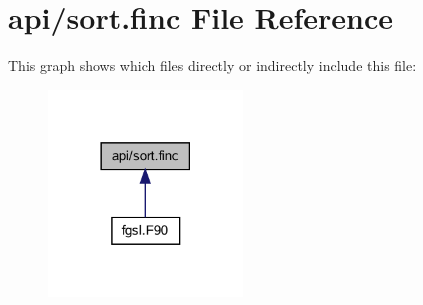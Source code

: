 \hypertarget{sort_8finc}{}\section{api/sort.finc File Reference}
\label{sort_8finc}
This graph shows which files directly or indirectly include this file\+:\nopagebreak
\begin{figure}[H]
\begin{center}
\leavevmode
\includegraphics[width=146pt]{sort_8finc__dep__incl}
\end{center}
\end{figure}
